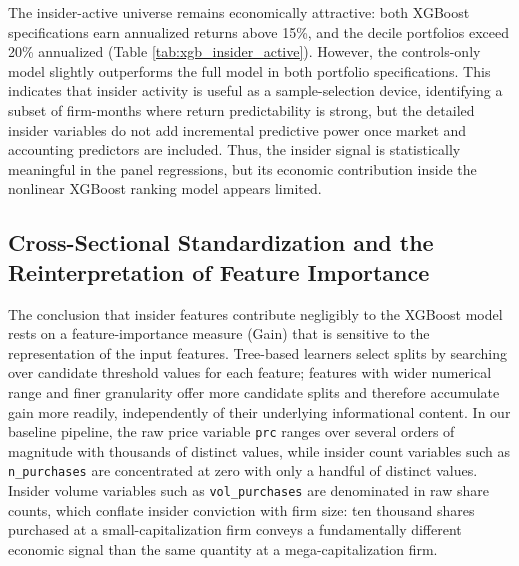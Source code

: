 \documentclass{article}
\begin{document}
The insider-active universe remains economically attractive: both XGBoost specifications earn annualized returns above 15\%, and the decile portfolios exceed 20\% annualized (Table \ref{tab:xgb_insider_active}). However, the controls-only model slightly outperforms the full model in both portfolio specifications. This indicates that insider activity is useful as a sample-selection device, identifying a subset of firm-months where return predictability is strong, but the detailed insider variables do not add incremental predictive power once market and accounting predictors are included. Thus, the insider signal is statistically meaningful in the panel regressions, but its economic contribution inside the nonlinear XGBoost ranking model appears limited.

\subsection{Cross-Sectional Standardization and the Reinterpretation of Feature Importance}

The conclusion that insider features contribute negligibly to the XGBoost model rests on a feature-importance measure (Gain) that is sensitive to the representation of the input features. Tree-based learners select splits by searching over candidate threshold values for each feature; features with wider numerical range and finer granularity offer more candidate splits and therefore accumulate gain more readily, independently of their underlying informational content. In our baseline pipeline, the raw price variable \texttt{prc} ranges over several orders of magnitude with thousands of distinct values, while insider count variables such as \texttt{n\_purchases} are concentrated at zero with only a handful of distinct values. Insider volume variables such as \texttt{vol\_purchases} are denominated in raw share counts, which conflate insider conviction with firm size: ten thousand shares purchased at a small-capitalization firm conveys a fundamentally different economic signal than the same quantity at a mega-capitalization firm.
\end{document}

